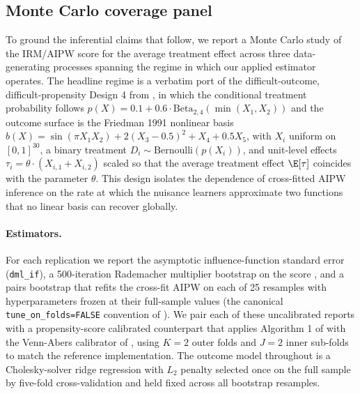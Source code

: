 
\subsection{Monte Carlo coverage panel}
\label{sec:sim-coverage}

To ground the inferential claims that follow, we report a Monte Carlo
study of the IRM/AIPW score for the average treatment effect across
three data-generating processes spanning the regime in which our
applied estimator operates.  The headline regime is a verbatim port of
the difficult-outcome, difficult-propensity Design 4 from
\citet{ballinari2024improving}, in which the conditional treatment
probability follows $p(X) = 0.1 + 0.6 \cdot \mathrm{Beta}_{2,4}(\min(X_1,
X_2))$ and the outcome surface is the Friedman 1991 nonlinear basis
$b(X) = \sin(\pi X_1 X_2) + 2(X_3 - 0.5)^2 + X_4 + 0.5 X_5$, with
$X_i$ uniform on $[0,1]^{30}$, a binary treatment $D_i \sim
\mathrm{Bernoulli}(p(X_i))$, and unit-level effects
$\tau_i = \theta \cdot (X_{i,1} + X_{i,2})$ scaled so that the average
treatment effect $\E[\tau]$ coincides with the parameter $\theta$.
This design isolates the dependence of cross-fitted AIPW inference on
the rate at which the nuisance learners approximate two functions that
no linear basis can recover globally.

\paragraph{Estimators.} For each replication we report the asymptotic
influence-function standard error (\texttt{dml\_if}), a 500-iteration
Rademacher multiplier bootstrap on the score
\citep{chernozhukov2018double}, and a pairs bootstrap that refits the
cross-fit AIPW on each of 25 resamples with hyperparameters frozen at
their full-sample values (the canonical
\texttt{tune\_on\_folds=FALSE} convention of \citealp{bach2024doubleml}).
We pair each of these uncalibrated reports with a propensity-score
calibrated counterpart that applies Algorithm 1 of
\citet{ballinari2024improving} with the Venn-Abers calibrator of
\citet{vovk2015large}, using $K{=}2$ outer folds and $J{=}2$ inner
sub-folds to match the reference implementation. The outcome model
throughout is a Cholesky-solver ridge regression with $L_2$ penalty
selected once on the full sample by five-fold cross-validation and held
fixed across all bootstrap resamples.

